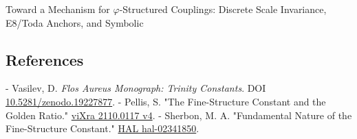   Toward a Mechanism for $\varphi$-Structured
  Couplings: Discrete Scale Invariance,
  E8/Toda Anchors, and Symbolic

\subsection{References}

- Vasilev, D. \textit{Flos Aureus Monograph: Trinity Constants}. DOI \href{https://zenodo.org/doi/10.5281/zenodo.19227877}{10.5281/zenodo.19227877}.
- Pellis, S. "The Fine-Structure Constant and the Golden Ratio." \href{https://vixra.org/pdf/2110.0117v4.pdf}{viXra 2110.0117 v4}.
- Sherbon, M. A. "Fundamental Nature of the Fine-Structure Constant." \href{https://hal.science/hal-02341850/document}{HAL hal-02341850}.
